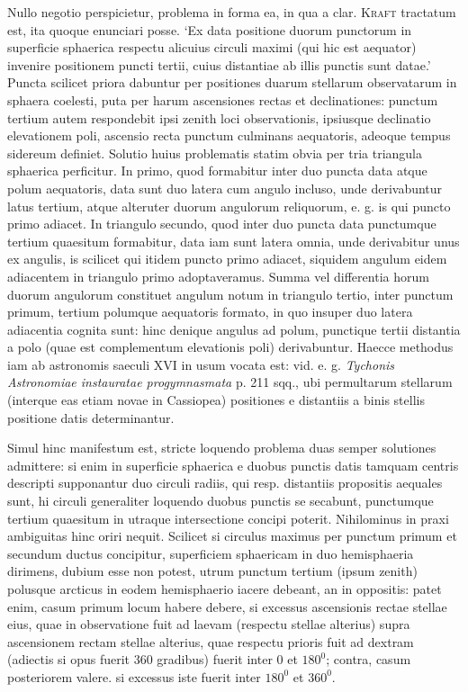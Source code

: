 Nullo negotio perspicietur, problema in forma ea, in qua a clar. \textsc{Kraft} tractatum est, ita quoque enunciari posse. `Ex data positione duorum punctorum in superficie sphaerica respectu alicuius circuli maximi (qui hic est aequator) invenire positionem puncti tertii, cuius distantiae ab illis punctis sunt datae.' Puncta scilicet priora dabuntur per positiones duarum stellarum observatarum in sphaera coelesti, puta per harum ascensiones rectas et declinationes: punctum tertium autem respondebit ipsi zenith loci observationis, ipsiusque declinatio elevationem poli, ascensio recta punctum culminans aequatoris, adeoque tempus sidereum definiet. Solutio huius problematis statim obvia per tria triangula sphaerica perficitur. In primo, quod formabitur inter duo puncta data atque polum aequatoris, data sunt duo latera cum angulo incluso, unde derivabuntur latus tertium, atque alteruter duorum angulorum reliquorum, e. g. is qui puncto primo adiacet. In triangulo secundo, quod inter duo puncta data punctumque tertium quaesitum formabitur, data iam sunt latera omnia, unde derivabitur unus ex angulis, is scilicet qui itidem puncto primo adiacet, siquidem angulum eidem adiacentem in triangulo primo adoptaveramus. Summa vel differentia horum duorum angulorum constituet angulum notum in triangulo tertio, inter punctum primum, tertium polumque aequatoris formato, in quo insuper duo latera adiacentia cognita sunt: hinc denique angulus ad polum, punctique tertii distantia a polo (quae est complementum elevationis poli) derivabuntur. Haecce methodus iam ab astronomis saeculi XVI in usum vocata est: vid. e. g. \textit{Tychonis Astronomiae instauratae progymnasmata} p. 211 sqq., ubi permultarum stellarum (interque eas etiam novae in Cassiopea) positiones e distantiis a binis stellis positione datis determinantur.

Simul hinc manifestum est, stricte loquendo problema duas semper solutiones admittere: si enim in superficie sphaerica e duobus punctis datis tamquam centris descripti supponantur duo circuli radiis, qui resp. distantiis propositis aequales sunt, hi circuli generaliter loquendo duobus punctis se secabunt, punctumque tertium quaesitum in utraque intersectione concipi poterit. Nihilominus in praxi ambiguitas hinc oriri nequit. Scilicet si circulus maximus per punctum primum et secundum ductus concipitur, superficiem sphaericam in duo hemisphaeria dirimens, dubium esse non potest, utrum punctum tertium (ipsum zenith) polusque arcticus in eodem hemisphaerio iacere debeant, an in oppositis: patet enim, casum primum locum habere debere, si excessus ascensionis rectae stellae eius, quae in observatione fuit ad laevam (respectu stellae alterius) supra ascensionem rectam stellae alterius, quae respectu prioris fuit ad dextram (adiectis si opus fuerit $360$ gradibus) fuerit inter $0$ et $180^0$; contra, casum posteriorem valere. si excessus iste fuerit inter $180^0$ et $360^0$.

